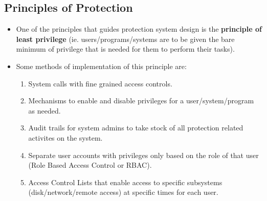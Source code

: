 \documentclass{article}
\theoremstyle{plain}
\theoremstyle{definition}
\begin{document}
\subsection{Principles of Protection}
\begin{itemize}
    \item One of the principles that guides protection system design is the \textbf{principle of least privilege} (ie. users/programs/systems are to be given the bare minimum of privilege that is needed for them to perform their tasks). 
    
    \item Some methods of implementation of this principle are:
    \begin{enumerate}
        \item System calls with fine grained access controls.
        
        \item Mechanisms to enable and disable privileges for a user/system/program as needed.
        
        \item Audit trails for system admins to take stock of all protection related activites on the system.
        
        \item Separate user accounts with privileges only based on the role of that user (Role Based Access Control or RBAC). 
        
        \item Access Control Lists that enable access to specific subsystems (disk/network/remote access) at specific times for each user. 
    \end{enumerate}
\end{itemize}
\end{document}
